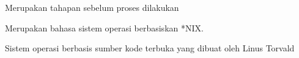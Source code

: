 Merupakan tahapan sebelum proses dilakukan

Merupakan bahasa sistem operasi berbasiskan *NIX.

Sistem operasi berbasis sumber kode terbuka yang dibuat oleh Linus Torvald